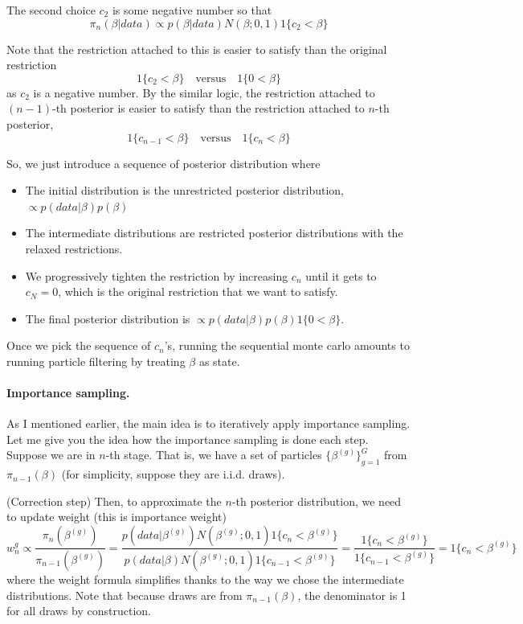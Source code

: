 \documentclass[11pt]{article}
\begin{document}
The second choice $c_{2}$ is some negative number so that 
\[
\pi_{n}(\beta|data) \propto p(\beta|data) N(\beta; 0, 1) 1\{ c_{2} < \beta\}
\]

Note that the restriction attached to this is easier to satisfy than the original restriction 
\[
1\{c_{2} < \beta \} \quad \text{versus} \quad 1\{0 < \beta \}
\]
as $c_{2}$ is a negative number. By the similar logic, the restriction attached to $(n-1)$-th posterior is easier to satisfy than the restriction attached to $n$-th posterior,
\[
1\{c_{n-1} < \beta \} \quad \text{versus} \quad 1\{c_{n} < \beta \}
\]

So, we just introduce a sequence of posterior distribution where
\begin{itemize}	
\item The initial distribution is the unrestricted posterior distribution, $\propto p(data|\beta) p(\beta)$
\item The intermediate distributions are restricted posterior distributions with the relaxed restrictions.
\item We progressively tighten the restriction by increasing $c_{n}$ until it gets to $c_{N} = 0$, which is the original restriction that we want to satisfy.
\item The final posterior distribution is $\propto p(data|\beta) p(\beta) 1\{0 < \beta\}$.
\end{itemize}

Once we pick the sequence of $c_{n}$'s, running the sequential monte carlo amounts to running particle filtering by treating $\beta$ as state. 

\paragraph{Importance sampling.} As I mentioned earlier, the main idea is to iteratively apply importance sampling. Let me give you the idea how the importance sampling is done each step. Suppose we are in $n$-th stage. That is, we have a set of particles $\{\beta^{(g)}\}_{g=1}^{G}$ from $\pi_{n-1}(\beta)$ (for simplicity, suppose they are i.i.d. draws). 

(Correction step) Then, to approximate the $n$-th posterior distribution, we need to update weight (this is importance weight)
\[
w^{g}_{n} \propto \frac{\pi_{n}(\beta^{(g)})}{\pi_{n-1}(\beta^{(g)})} = \frac{p(data|\beta^{(g)})N(\beta^{(g)}; 0,1) 1\{c_{n}<\beta^{(g)}\}}{p(data|\beta)N(\beta^{(g)}; 0,1) 1\{c_{n-1}<\beta^{(g)}\}} = \frac{1\{c_{n}<\beta^{(g)}\}}{1\{c_{n-1}<\beta^{(g)}\}} = 1\{c_{n} < \beta^{(g)}\}
\]
where the weight formula simplifies thanks to the way we chose the intermediate distributions.
Note that because draws are from $\pi_{n-1}(\beta)$, the denominator is 1 for all draws by construction.
\end{document}
